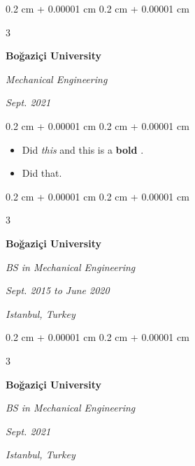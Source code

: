 \documentclass[10pt, letterpaper]{article}
\newenvironment{highlights}{
    \begin{itemize}[
        topsep=0.10 cm,
        parsep=0.10 cm,
        partopsep=0pt,
        itemsep=0pt,
        leftmargin=0.4 cm + 10pt + 0.6 cm
    ]
}{
    \end{itemize}
} %
\newenvironment{onecolentry}{
    \begin{adjustwidth}{
        0.2 cm + 0.00001 cm
    }{
        0.2 cm + 0.00001 cm
    }
}{
    \end{adjustwidth}
} %
\newenvironment{threecolentry}[3][]{
    \onecolentry
    \def\thirdColumn{#3}
    \setcolumnwidth{0.6 cm, \fill, 4.5 cm}
    \begin{paracol}{3}
    #2 \switchcolumn
}{
    \switchcolumn \raggedleft \thirdColumn
    \end{paracol}
    \endonecolentry
} %
\let\hrefWithoutArrow\href
\renewcommand{\href}[2]{\hrefWithoutArrow{#1}{\mbox{\ifthenelse{\equal{#2}{}}{ }{#2 }\raisebox{.15ex}{\footnotesize \faExternalLink*}}}}
\begin{document}
        \vspace{0.2 cm}

        \begin{threecolentry}{
            \vspace*{\fill}
            \textbullet
            \vspace*{3px}
            \vspace*{\fill}
        }{
        \textit{Sept. 2021}
            
        }
            \textbf{Boğaziçi University}

            \textit{Mechanical Engineering}
        \end{threecolentry}

        \vspace{0.10 cm}
        \begin{onecolentry}
            \begin{highlights}
                \item Did \textit{this} and this is a \textbf{bold} \href{https://example.com}{link}.
                \item Did that.
            \end{highlights}
        \end{onecolentry}


        \vspace{0.2 cm}

        \begin{threecolentry}{
            \vspace*{\fill}
            \textbullet
            \vspace*{3px}
            \vspace*{\fill}
        }{
        \textit{Sept. 2015 to June 2020}
            
        \textit{Istanbul, Turkey}}
            \textbf{Boğaziçi University}

            \textit{BS in Mechanical Engineering}
        \end{threecolentry}



        \vspace{0.2 cm}

        \begin{threecolentry}{
            \vspace*{\fill}
            \textbullet
            \vspace*{3px}
            \vspace*{\fill}
        }{
        \textit{Sept. 2021}
            
        \textit{Istanbul, Turkey}}
            \textbf{Boğaziçi University}

            \textit{BS in Mechanical Engineering}
        \end{threecolentry}
\end{document}
